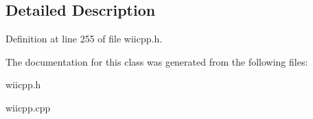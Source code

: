 \subsection{Detailed Description}


Definition at line 255 of file wiicpp.\-h.



The documentation for this class was generated from the following files\-:\begin{DoxyCompactItemize}
\item 
wiicpp.\-h\item 
wiicpp.\-cpp\end{DoxyCompactItemize}
